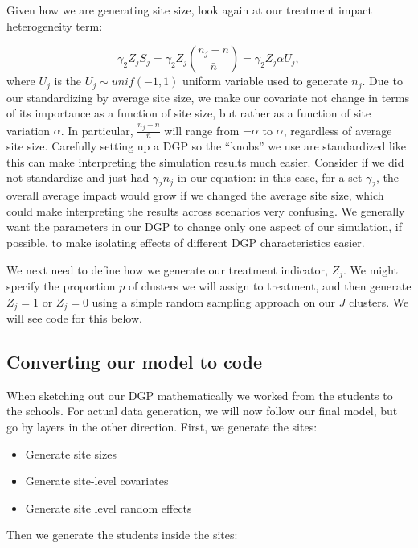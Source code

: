 \documentclass[
]{book}
\providecommand{\tightlist}{%
  \setlength{\itemsep}{0pt}\setlength{\parskip}{0pt}}
\begin{document}
Given how we are generating site size, look again at our treatment impact heterogeneity term:

\[ \gamma_2 Z_j S_j = \gamma_2 Z_j \left(\frac{n_j - \bar{n}}{\bar{n}}\right) = \gamma_2 Z_j \alpha U_j, \]
where \(U_j\) is the \(U_j \sim unif(-1,1)\) uniform variable used to generate \(n_j\).
Due to our standardizing by average site size, we make our covariate not change in terms of its importance as a function of site size, but rather as a function of site variation \(\alpha\).
In particular, \(\frac{n_j - \bar{n}}{\bar{n}}\) will range from \(-\alpha\) to \(\alpha\), regardless of average site size.
Carefully setting up a DGP so the ``knobs'' we use are standardized like this can make interpreting the simulation results much easier.
Consider if we did not standardize and just had \(\gamma_2 n_j\) in our equation: in this case, for a set \(\gamma_2\), the overall average impact would grow if we changed the average site size, which could make interpreting the results across scenarios very confusing.
We generally want the parameters in our DGP to change only one aspect of our simulation, if possible, to make isolating effects of different DGP characteristics easier.

We next need to define how we generate our treatment indicator, \(Z_j\).
We might specify the proportion \(p\) of clusters we will assign to treatment, and then generate \(Z_j = 1\) or \(Z_j = 0\) using a simple random sampling approach on our \(J\) clusters.
We will see code for this below.

\subsection{Converting our model to code}\label{converting-our-model-to-code}

When sketching out our DGP mathematically we worked from the students to the schools.
For actual data generation, we will now follow our final model, but go by layers in the other direction.
First, we generate the sites:

\begin{itemize}
\tightlist
\item
  Generate site sizes
\item
  Generate site-level covariates
\item
  Generate site level random effects
\end{itemize}

Then we generate the students inside the sites:
\end{document}
